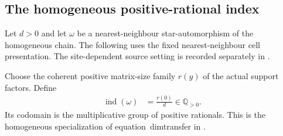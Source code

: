 \subsection{The homogeneous positive-rational index}
\label{sec:qca_gnvw_index}

Let $d>0$ and let $\omega$ be a nearest-neighbour star-automorphism of the
homogeneous chain. The following uses the fixed nearest-neighbour cell
presentation. The site-dependent source setting is recorded separately in
\cite{gap:gnvw12_site_dependent_adjacent_generation_scope}.

\begin{definition}
    \label{def:qca_gnvw_index}
    \leanok
    Choose the coherent positive matrix-size family $r(y)$ of the actual
    support factors. Define
    \begin{align}
        \operatorname{ind}(\omega) & =\frac{r(0)}{d}\in\mathbb Q_{>0}.
        \label{eq:qca_gnvw_index_fixed_cut}
    \end{align}
    Its codomain is the multiplicative group of positive rationals.
    This is the homogeneous specialization of equation~dimtransfer in
    \cite[lines~1317--1329]{Gross2012IndexTheory}.
\end{definition}

